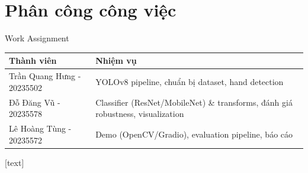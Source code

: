 \documentclass[t, aspectratio=169]{beamer} %
\begin{document}
	\section{Phân công công việc}
	\begin{frame}{Work Assignment}
		\small
		\begin{table}
			\centering
			\begin{tabular}{p{}p{}}
				\toprule
				\textbf{Thành viên} & \textbf{Nhiệm vụ} \\
				\midrule
				Trần Quang Hưng - 20235502 & YOLOv8 pipeline, chuẩn bị dataset, hand detection \\
				\addlinespace
				Đỗ Đăng Vũ - 20235578 & Classifier (ResNet/MobileNet) \& transforms, đánh giá robustness, visualization \\
				\addlinespace
				Lê Hoàng Tùng - 20235572 & Demo (OpenCV/Gradio), evaluation pipeline, báo cáo \\
				\bottomrule
			\end{tabular}
		\end{table}
	\end{frame}


	\useStyleLogoOnly
	[text]
\end{document}
